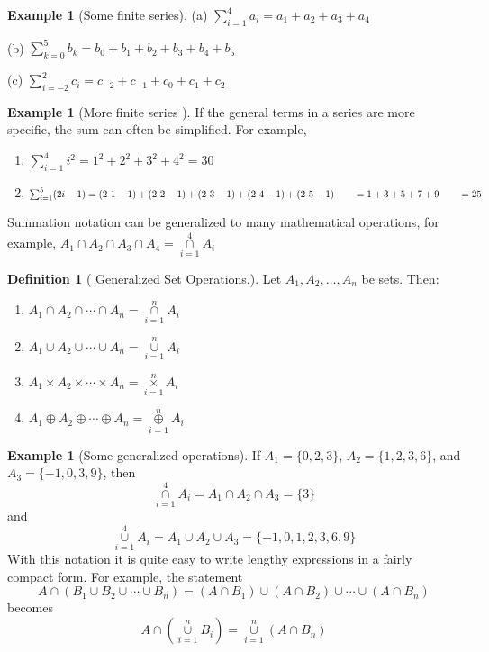 \documentclass[10pt,]{book}
\theoremstyle{plain}
\theoremstyle{definition}
\newtheorem{definition}[theorem]{Definition}
\newtheorem{example}[theorem]{Example}
\begin{document}
%
\begin{example}[Some finite series]\label{some_finite_series}
(a)  \(\sum _{i=1}^4 a_i= a_1+ a_2+a_3+a_4\)%
\par
(b) \(\sum _{k=0}^5 b_k=b_0+b_1+b_2+b_3+b_4+b_5\)%
\par
(c) \(\sum _{i=-2}^2 c_i=c_{-2}+c_{-1}+c_0+c_1+c_2\)%
\end{example}
\begin{example}[More finite series ]\label{more_finite_series}
If the general terms in a series are more specific, the sum can often be simplified. For example, 
\leavevmode%
\begin{enumerate}
\item\hypertarget{li-169}{} \(\sum _{i=1}^4 i^2=1^2+2^2+3^2+4^2=30\) \item\hypertarget{li-170}{} \(\sum _{i=1}^5 (2i-1)=(2\ 1-1)+(2\ 2-1)+(2\ 3-1)+(2\ 4-1)+(2\ 5-1)\\
\\
\quad \quad =1+3+5+7+9\\
\\
\quad \quad =25\)\end{enumerate}

%
\end{example}
\par
Summation notation can be generalized to many mathematical operations, for example, 
\(A_1\cap A_2\cap A_3\cap A_4=\underset{i=1}{\overset{4}{\cap }}A_i\) %
\begin{definition}[ Generalized Set Operations.]\label{generalized-set-operations}
Let \(A_1, A_2, \ldots , A_n\) be sets. Then: 
\leavevmode%
\begin{enumerate}
\item\hypertarget{li-171}{}  \(A_1\cap A_2\cap \cdots \cap A_n=\underset{i=1}{\overset{n}{\cap }}A_i\)\item\hypertarget{li-172}{}   \(A_1\cup A_2\cup \cdots \cup A_n=\underset{i=1}{\overset{n}{\cup }}A_i\)\item\hypertarget{li-173}{}   \(A_1\times A_2\times \cdots \times A_n=\underset{i=1}{\overset{n}{\times }}A_i\)\item\hypertarget{li-174}{}   \(A_1\oplus A_2\oplus \cdots \oplus A_n=\underset{i=1}{\overset{n}{\oplus }}A_i\)\end{enumerate}
\end{definition}
\begin{example}[Some generalized operations]\label{some_generalized_operations}
If \(A_1 = \{0, 2, 3\}\), \(A_2 = \{1, 2, 3, 6\}\), and \(A_3 = \{-1, 0, 3, 9\}\), then 
 \[\underset{i=1}{\overset{4}{\cap }}A_i=A_1\cap A_2\cap A_3=\{3\}\]
and
\[\underset{i=1}{\overset{4}{\cup }}A_i=A_1\cup A_2\cup A_3=\{-1,0,1,2,3,6,9\}\]
With this notation it is quite easy to write lengthy expressions in a fairly compact form. For example, the statement 
    \[A\cap \left(B_1\cup B_2\cup \cdots \cup B_n\right)= \left(A\cap B_1\right)\cup \left(A\cap B_2\right)\cup \cdots \cup \left(A\cap
B_n\right)\]
becomes 
   \[A \cap \left(\underset{i=1}{\overset{n}{\cup }}B_i\right)= \underset{i=1}{\overset{n}{\cup }}\left(A\cap B_n\right)\]%
\end{example}
\end{document}

